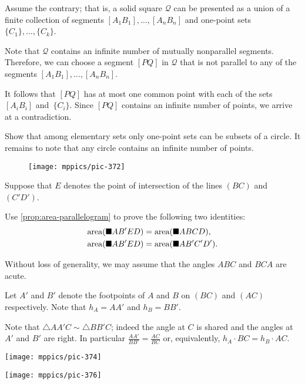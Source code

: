 \begin{multicols}{2}
Assume the contrary; that is, a solid square $\mathcal{Q}$ can be presented as a union of a finite collection of segments $[A_1B_1],\dots,[A_nB_n]$
and one-point sets $\{C_1\},\dots,\{C_k\}$.

Note that $\mathcal{Q}$ contains an infinite number of mutually nonparallel segments.
Therefore, we can choose a segment $[PQ]$ in $\mathcal{Q}$ 
that is not parallel to any of the segments $[A_1B_1],\dots,[A_nB_n]$.

It follows that $[PQ]$ has at most one common point with each of the sets $[A_iB_i]$ and~$\{C_i\}$.
Since $[PQ]$ contains an infinite number of points, we arrive at a contradiction.

Show that among elementary sets
only one-point sets can be subsets of a circle.
It remains to note that any circle contains an infinite number of points.

{

\begin{wrapfigure}{r}{28mm}
\vskip-4mm
\centering
\texttt{[image: mppics/pic-372]}

\end{wrapfigure}

Suppose that $E$ denotes the point of intersection of the lines $(BC)$ and~$(C'D')$.

Use \ref{prop:area-parallelogram} to prove the following two identities:
\begin{align*}
\mathop{\rm area}\nolimits(\blacksquare AB'ED)
&=\mathop{\rm area}\nolimits(\blacksquare ABCD),
\\
\mathop{\rm area}\nolimits(\blacksquare AB'ED)
&=\mathop{\rm area}\nolimits(\blacksquare AB'C'D').
\end{align*}

}

Without loss of generality, we may assume that the angles $ABC$ and $BCA$ are acute.

Let $A'$ and $B'$ denote the footpoints of $A$ and $B$ on $(BC)$ and $(AC)$ respectively.
Note that $h_A=AA'$ and $h_B=BB'$.

Note that $\triangle AA'C\sim \triangle BB'C$;
indeed the angle at $C$ is shared and the angles at $A'$ and $B'$ are right.
In particular
$\frac{AA'}{BB'}=\frac{AC}{BC}$
or, equivalently, $h_A\cdot BC=h_B\cdot AC$.

\begin{Figure}
\vskip-0mm
\begin{minipage}{.49\textwidth}
\centering
\texttt{[image: mppics/pic-374]}
\end{minipage}
\hfill
\begin{minipage}{.49\textwidth}
\centering
\texttt{[image: mppics/pic-376]}
\end{minipage}
\end{Figure}


\end{multicols}

